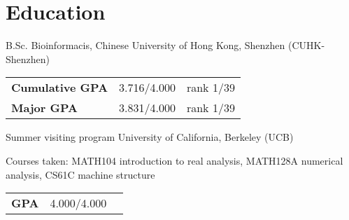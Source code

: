 \documentclass[12pt,a4paper,sans]{moderncv}
\newcommand{\cvsection}[1]{\section{{#1}}}
\begin{document}
\maketitle

\vspace{-1em}
\cvsection{Education}
    {B.Sc.}
    {}
    {Bioinformacis, Chinese University of Hong Kong, Shenzhen (CUHK-Shenzhen)}
    {}
    {\begin{tabular}{@{}lrr@{}}
        \textbf{Cumulative GPA} & 3.716/4.000 & rank 1/39\\
        \textbf{Major GPA} & 3.831/4.000 & rank 1/39\\
    \end{tabular}}
    {Summer visiting program}
    {}
    {University of California, Berkeley (UCB)}
    {}
    {Courses taken: MATH104 introduction to real analysis,
    MATH128A numerical analysis, CS61C machine structure\\
    \begin{tabular}{@{}lrr@{}}
        \textbf{GPA} & 4.000/4.000 &  \\
    \end{tabular}}




\end{document}
